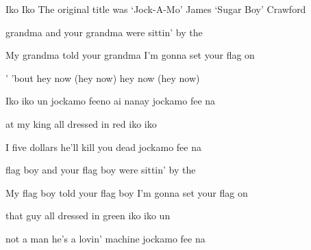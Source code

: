\begin{SBSong}{Iko Iko}
  {The original title was `Jock-A-Mo'}
  {James `Sugar Boy' Crawford}
  \begin{SBVerse}
     grandma and your grandma were sittin' by the  
    
    My grandma told your grandma I'm gonna set your flag on 
  \end{SBVerse}
  \begin{SBChorus}
    ' 'bout hey now (hey now) hey now (hey now)
    
    Iko iko un jockamo feeno ai nanay jockamo fee na 
  \end{SBChorus}
  \begin{SBVerse}
     at my king all dressed in red iko iko 
    
    I  five dollars he'll kill you dead jockamo fee na 
  \end{SBVerse}
  \begin{SBVerse}
     flag boy and your flag boy were sittin' by the  
    
    My flag boy told your flag boy I'm gonna set your flag on  
  \end{SBVerse}
  \begin{SBVerse}
     that guy all dressed in green iko iko un 
    
     not a man he's a lovin' machine jockamo fee na 
  \end{SBVerse}
\end{SBSong}